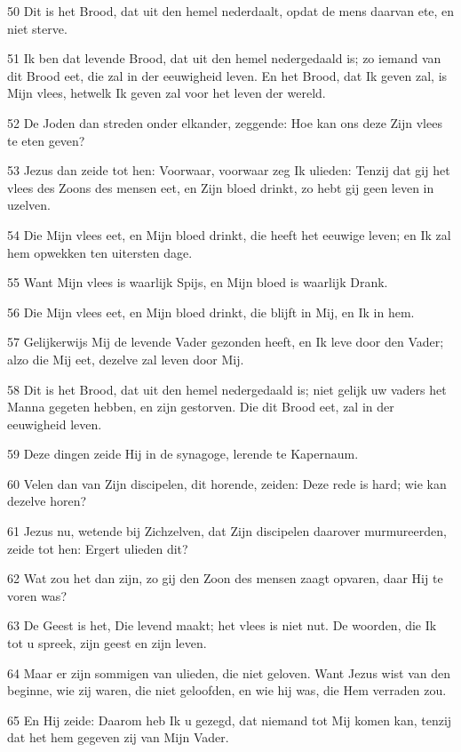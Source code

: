 \par 50 Dit is het Brood, dat uit den hemel nederdaalt, opdat de mens daarvan ete, en niet sterve.
\par 51 Ik ben dat levende Brood, dat uit den hemel nedergedaald is; zo iemand van dit Brood eet, die zal in der eeuwigheid leven. En het Brood, dat Ik geven zal, is Mijn vlees, hetwelk Ik geven zal voor het leven der wereld.
\par 52 De Joden dan streden onder elkander, zeggende: Hoe kan ons deze Zijn vlees te eten geven?
\par 53 Jezus dan zeide tot hen: Voorwaar, voorwaar zeg Ik ulieden: Tenzij dat gij het vlees des Zoons des mensen eet, en Zijn bloed drinkt, zo hebt gij geen leven in uzelven.
\par 54 Die Mijn vlees eet, en Mijn bloed drinkt, die heeft het eeuwige leven; en Ik zal hem opwekken ten uitersten dage.
\par 55 Want Mijn vlees is waarlijk Spijs, en Mijn bloed is waarlijk Drank.
\par 56 Die Mijn vlees eet, en Mijn bloed drinkt, die blijft in Mij, en Ik in hem.
\par 57 Gelijkerwijs Mij de levende Vader gezonden heeft, en Ik leve door den Vader; alzo die Mij eet, dezelve zal leven door Mij.
\par 58 Dit is het Brood, dat uit den hemel nedergedaald is; niet gelijk uw vaders het Manna gegeten hebben, en zijn gestorven. Die dit Brood eet, zal in der eeuwigheid leven.
\par 59 Deze dingen zeide Hij in de synagoge, lerende te Kapernaum.
\par 60 Velen dan van Zijn discipelen, dit horende, zeiden: Deze rede is hard; wie kan dezelve horen?
\par 61 Jezus nu, wetende bij Zichzelven, dat Zijn discipelen daarover murmureerden, zeide tot hen: Ergert ulieden dit?
\par 62 Wat zou het dan zijn, zo gij den Zoon des mensen zaagt opvaren, daar Hij te voren was?
\par 63 De Geest is het, Die levend maakt; het vlees is niet nut. De woorden, die Ik tot u spreek, zijn geest en zijn leven.
\par 64 Maar er zijn sommigen van ulieden, die niet geloven. Want Jezus wist van den beginne, wie zij waren, die niet geloofden, en wie hij was, die Hem verraden zou.
\par 65 En Hij zeide: Daarom heb Ik u gezegd, dat niemand tot Mij komen kan, tenzij dat het hem gegeven zij van Mijn Vader.
